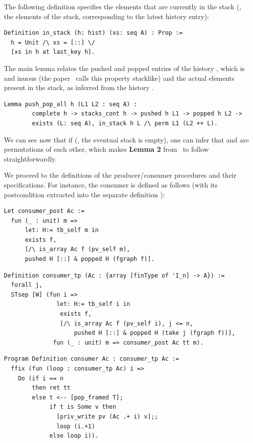 The following definition specifies the elements that are currently in
the stack (\ie, the elements of the stack, corresponding to the latest
history entry):

\begin{lstlisting}
Definition in_stack (h: hist) (xs: seq A) : Prop :=
  h = Unit /\ xs = [::] \/
  [xs in h at last_key h].    
\end{lstlisting}

The main lemma  relates the pushed and popped
entries of the history , which is  and
inuous (the paper~\cite{Sergey-al:ESOP15} calls this
property \textsf{stacklike}) and the actual elements present in the
stack, as inferred from the history .

\begin{lstlisting}
Lemma push_pop_all h (L1 L2 : seq A) :
        complete h -> stacks_cont h -> pushed h L1 -> popped h L2 -> 
        exists (L: seq A), in_stack h L /\ perm L1 (L2 ++ L).  
\end{lstlisting}

We can see now that if  (\ie, the eventual stack is
empty), one can infer that  and  are permutations of
each other, which makes \textbf{Lemma 2} from~\cite{Sergey-al:ESOP15}
to follow straightforwardly.

We proceed to the definitions of the producer/consumer procedures and
their specifications. For instance, the consumer is defined as follows
(with its postcondition extracted into the separate definition
):

\begin{lstlisting}
Let consumer_post Ac := 
  fun (_ : unit) m => 
      let: H:= tb_self m in
      exists f,
      [/\ is_array Ac f (pv_self m), 
      pushed H [::] & popped H (fgraph f)].
\end{lstlisting}

\begin{lstlisting}
Definition consumer_tp (Ac : {array [finType of 'I_n] -> A}) := 
  forall j,
  STsep [W] (fun i => 
               let: H:= tb_self i in
                exists f,
                [/\ is_array Ac f (pv_self i), j <= n,
                    pushed H [::] & popped H (take j (fgraph f))],
              fun (_ : unit) m => consumer_post Ac tt m).
\end{lstlisting}

\begin{lstlisting}
Program Definition consumer Ac : consumer_tp Ac :=   
  ffix (fun (loop : consumer_tp Ac) i =>
    Do (if i == n 
        then ret tt
        else t <-- [pop_framed T];
             if t is Some v then
               [priv_write pv (Ac .+ i) v];;
               loop (i.+1)
             else loop i)).
\end{lstlisting}

